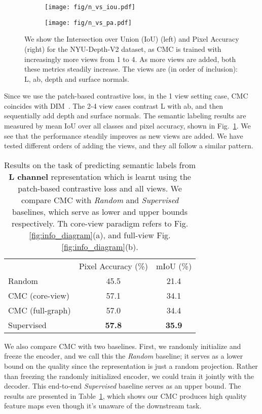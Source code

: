 \documentclass[10pt,twocolumn,letterpaper]{article}
\newcommand{\citep}[1]{\cite{#1}}
\begin{document}
\begin{figure}
  \centering
  \begin{subfigure}[]{0.23\textwidth}
    \texttt{[image: fig/n\_vs\_iou.pdf]}
  \end{subfigure}
  \begin{subfigure}[]{0.23\textwidth}
    \texttt{[image: fig/n\_vs\_pa.pdf]}
  \end{subfigure}
  \caption{\small{We show the Intersection over Union (IoU) (left) and Pixel Accuracy (right) for the NYU-Depth-V2 dataset, as CMC is trained with increasingly more views from 1 to 4. As more views are added, both these metrics steadily increase. The views are (in order of inclusion): L, ab, depth and surface normals.}}
  \label{fig:iou_pa}
\end{figure} 
Since we use the patch-based contrastive loss, in the 1 view setting case, CMC coincides with DIM~\citep{hjelm2018learning}.  
The 2-4 view cases contrast L with ab, and then sequentially add depth and surface normals. The semantic labeling results are measured by mean IoU over all classes and pixel accuracy, shown in Fig.~\ref{fig:iou_pa}. We see that the performance steadily improves as new views are added. We have tested different orders of adding the views, and they all follow a similar pattern.

\begin{table}[t]
	\centering
	\setlength{\tabcolsep}{3.5pt}
    \begin{tabular}{l|cc}
     & Pixel Accuracy (\%) & mIoU (\%) \\
    \shline
    Random & 45.5 & 21.4  \\
    CMC (core-view) & 57.1 & 34.1 \\
    CMC (full-graph) & 57.0 & 34.4 \\
    Supervised & \textbf{57.8} & \textbf{35.9} \\
    \end{tabular}
    \caption{\small{Results on the task of predicting semantic labels from \textbf{L channel} representation which is learnt using the patch-based contrastive loss and all  views. We compare CMC with \emph{Random} and \emph{Supervised} baselines, which serve as lower and upper bounds respectively. Th core-view paradigm refers to Fig. \ref{fig:info_diagram}(a), and full-view Fig. \ref{fig:info_diagram}(b).}}
    \label{tbl:nyu_L}
\vspace{-10pt}
\end{table} 
We also compare CMC with two baselines. First, we randomly initialize and freeze the encoder, and we call this the \emph{Random} baseline; it serves as a lower bound on the quality since the representation is just a random projection. Rather than freezing the randomly initialized encoder, we could train it jointly with the decoder. This end-to-end \emph{Supervised} baseline serves as an upper bound. The results are presented in Table~\ref{tbl:nyu_L}, which shows our CMC produces high quality feature maps even though it's unaware of the downstream task.
\end{document}

